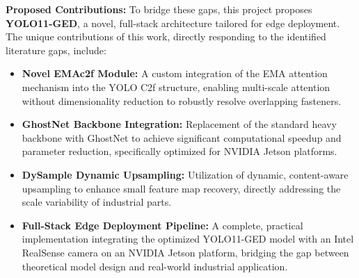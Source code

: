 \textbf{Proposed Contributions:} To bridge these gaps, this project proposes \textbf{YOLO11-GED}, a novel, full-stack architecture tailored for edge deployment. The unique contributions of this work, directly responding to the identified literature gaps, include:
\begin{itemize}
    \item \textbf{Novel EMAc2f Module:} A custom integration of the EMA attention mechanism into the YOLO C2f structure, enabling multi-scale attention without dimensionality reduction to robustly resolve overlapping fasteners.
    \item \textbf{GhostNet Backbone Integration:} Replacement of the standard heavy backbone with GhostNet to achieve significant computational speedup and parameter reduction, specifically optimized for NVIDIA Jetson platforms.
    \item \textbf{DySample Dynamic Upsampling:} Utilization of dynamic, content-aware upsampling to enhance small feature map recovery, directly addressing the scale variability of industrial parts.
    \item \textbf{Full-Stack Edge Deployment Pipeline:} A complete, practical implementation integrating the optimized YOLO11-GED model with an Intel RealSense camera on an NVIDIA Jetson platform, bridging the gap between theoretical model design and real-world industrial application.
\end{itemize}